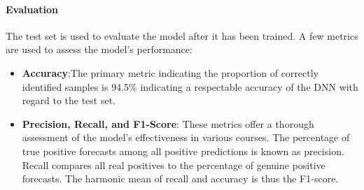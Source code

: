 \documentclass[conference]{IEEEtran}
\begin{document}
\paragraph{Evaluation}
The test set is used to evaluate the model after it has been trained. A few metrics are used to assess the model's performance:


\begin{itemize}
    \item \textbf{Accuracy}:The primary metric indicating the proportion of correctly identified samples is 94.5\% indicating a respectable accuracy of the DNN with regard to the test set.

    \item \textbf{Precision, Recall, and F1-Score}: These metrics offer a thorough assessment of the model's effectiveness in various courses. The percentage of true positive forecasts among all positive predictions is known as precision. Recall compares all real positives to the percentage of genuine positive forecasts. The harmonic mean of recall and accuracy is thus the F1-score.
    

\end{itemize}
\end{document}

